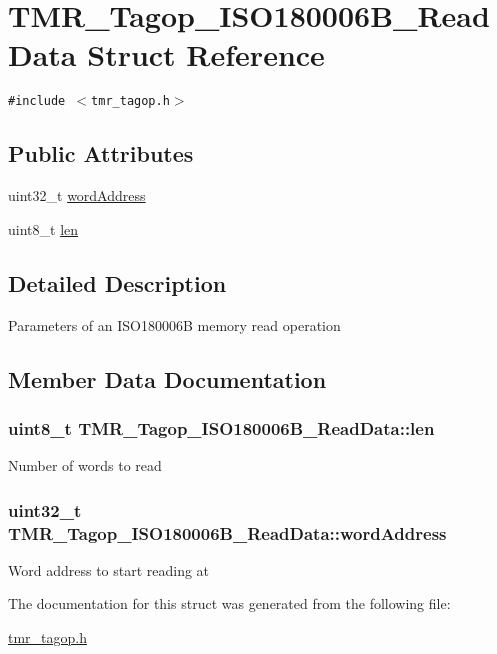 \hypertarget{struct_t_m_r___tagop___i_s_o180006_b___read_data}{
\section{TMR\_\-Tagop\_\-ISO180006B\_\-ReadData Struct Reference}
\label{struct_t_m_r___tagop___i_s_o180006_b___read_data}
}
{\tt \#include $<$tmr\_\-tagop.h$>$}

\subsection*{Public Attributes}
\begin{CompactItemize}
\item 
uint32\_\-t \hyperlink{struct_t_m_r___tagop___i_s_o180006_b___read_data_8b760410d9543fd4781c6a220c1649a2}{wordAddress}
\item 
uint8\_\-t \hyperlink{struct_t_m_r___tagop___i_s_o180006_b___read_data_b726317a2f92b25a2f3dc225bcc7416e}{len}
\end{CompactItemize}


\subsection{Detailed Description}
Parameters of an ISO180006B memory read operation 

\subsection{Member Data Documentation}
\hypertarget{struct_t_m_r___tagop___i_s_o180006_b___read_data_b726317a2f92b25a2f3dc225bcc7416e}{
\subsubsection[{len}]{\setlength{\rightskip}{0pt plus 5cm}uint8\_\-t {\bf TMR\_\-Tagop\_\-ISO180006B\_\-ReadData::len}}}
\label{struct_t_m_r___tagop___i_s_o180006_b___read_data_b726317a2f92b25a2f3dc225bcc7416e}


Number of words to read \hypertarget{struct_t_m_r___tagop___i_s_o180006_b___read_data_8b760410d9543fd4781c6a220c1649a2}{
\subsubsection[{wordAddress}]{\setlength{\rightskip}{0pt plus 5cm}uint32\_\-t {\bf TMR\_\-Tagop\_\-ISO180006B\_\-ReadData::wordAddress}}}
\label{struct_t_m_r___tagop___i_s_o180006_b___read_data_8b760410d9543fd4781c6a220c1649a2}


Word address to start reading at 

The documentation for this struct was generated from the following file:\begin{CompactItemize}
\item 
\hyperlink{tmr__tagop_8h}{tmr\_\-tagop.h}\end{CompactItemize}
